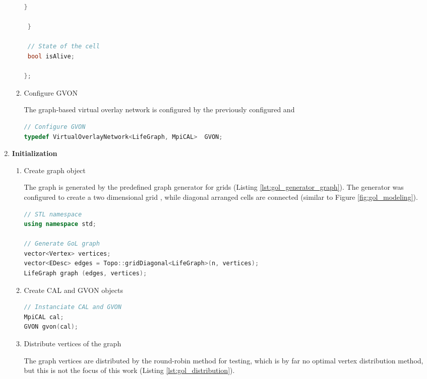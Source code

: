 \begin{enumerate}
\begin{enumerate}
\begin{lstlisting}[language=C++, label=lst:gol_cell, caption={\ }]
   }
   
 }

 // State of the cell
 bool isAlive;
 
};
\end{lstlisting}

\item Configure GVON

  The graph-based virtual overlay network is configured by the previously configured
   and 

  \begin{lstlisting}[language=C++, label=lst:conf_gvon, caption={\ }]
// Configure GVON
typedef VirtualOverlayNetwork<LifeGraph, MpiCAL>  GVON;
  \end{lstlisting}

\end{enumerate}

\item \textbf{Initialization}
  \begin{enumerate}
  
  \item Create graph object

    The graph is generated by the predefined graph generator for grids
    (Listing \ref{lst:gol_generator_graph}). The generator was
    configured to create a two dimensional grid , while diagonal
    arranged cells are connected (similar to Figure \ref{fig:gol_modeling}).

  \begin{lstlisting}[language=C++, label=lst:gol_generator_graph, caption={\ }]
// STL namespace
using namespace std;

// Generate GoL graph
vector<Vertex> vertices;
vector<EDesc> edges = Topo::gridDiagonal<LifeGraph>(n, vertices);
LifeGraph graph (edges, vertices); 
  \end{lstlisting}

\item Create CAL and GVON objects

  \begin{lstlisting}[language=C++, label=lst:, caption={\ }]
// Instanciate CAL and GVON
MpiCAL cal;
GVON gvon(cal);
  \end{lstlisting}

\item Distribute vertices of the graph

  The graph vertices are distributed by the round-robin method for
  testing, which is by far no optimal vertex distribution method, but
  this is not the focus of this work (Listing \ref{lst:gol_distribution}).  


\end{enumerate}
\end{enumerate}
